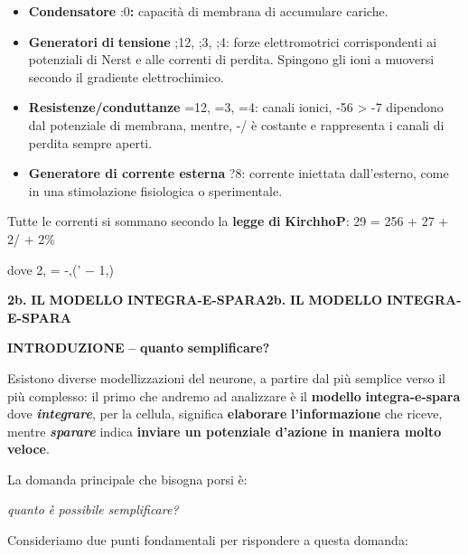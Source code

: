 \documentclass[12pt,a4paper]{book}
\begin{document}
\begin{itemize}
  \item \textbf{Condensatore}\textbf{ }:0\textbf{:}\textbf{ }capacità di membrana di accumulare cariche.
  \item \textbf{Generatori}\textbf{ }\textbf{di}\textbf{ }\textbf{tensione}\textbf{ };12, ;3, ;4: forze elettromotrici corrispondenti ai potenziali di Nerst e alle correnti di perdita. Spingono gli ioni a muoversi secondo il gradiente elettrochimico.
  \item \textbf{Resistenze/conduttanze}\textbf{ }=12, =3, =4: canali ionici, -56 > -7 dipendono dal potenziale di membrana, mentre, -/ è costante e rappresenta i canali di perdita sempre aperti.
  \item \textbf{Generatore di corrente esterna }?8: corrente iniettata dall'esterno, come in una stimolazione ﬁsiologica o sperimentale.
\end{itemize}
Tutte le correnti si sommano secondo la \textbf{legge}\textbf{ }\textbf{di}\textbf{ }\textbf{KirchhoP}: 29 = 256 + 27 + 2/ + 2\%

dove 2, = -,(' − 1,)

\textbf{2b.}\textbf{ }\textbf{IL}\textbf{ }\textbf{MODELLO}\textbf{ }\textbf{INTEGRA-E-}\textbf{SPARA}\textbf{2b.}\textbf{ }\textbf{IL}\textbf{ }\textbf{MODELLO}\textbf{ }\textbf{INTEGRA-E-}\textbf{SPARA}

\textbf{INTRODUZIONE}\textbf{ }\textbf{--}\textbf{ }\textbf{quanto}\textbf{ }\textbf{semplificare?}

Esistono diverse modellizzazioni del neurone, a partire dal più semplice verso il più complesso: il primo che andremo ad analizzare è il \textbf{modello}\textbf{ }\textbf{integra-e-spara}\textbf{ }dove \textbf{\textit{integrare}}, per la cellula, signiﬁca \textbf{elaborare}\textbf{ }\textbf{l'informazione}\textbf{ }che riceve, mentre \textbf{\textit{sparare}}\textbf{\textit{ }}indica \textbf{inviare un potenziale d'azione in maniera molto veloce}.

La domanda principale che bisogna porsi è:

\textit{quanto}\textit{ }\textit{è}\textit{ }\textit{possibile}\textit{ }\textit{sempliﬁcare?}

Consideriamo due punti fondamentali per rispondere a questa domanda:
\end{document}
